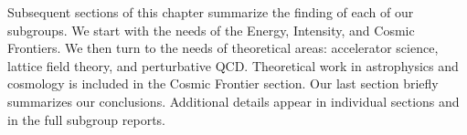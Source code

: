 Subsequent sections of this chapter summarize the finding of each of our subgroups.
We start with the needs of the Energy, Intensity, and Cosmic Frontiers.  We then
turn to the needs of theoretical areas: accelerator science, lattice field theory,
and perturbative QCD.  Theoretical work in astrophysics and cosmology is included
in the Cosmic Frontier section.  
Our last section briefly summarizes our conclusions.
Additional details appear in individual sections and in the full subgroup
reports.
